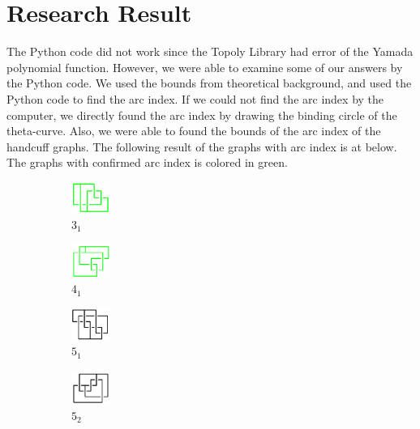 \documentclass{article}
\theoremstyle{definition}
\theoremstyle{theorem}
\theoremstyle{proposition}
\theoremstyle{corollary}
\begin{document}
\section{Research Result}
The Python code did not work since the Topoly Library had error of the Yamada polynomial function. However, we were able to examine some of our answers by the Python code.
We used the bounds from theoretical background, and used the Python code to find the arc index. If we could not find the arc index by the computer, we directly found the arc index by drawing the binding circle of the theta-curve.
 Also, we were able to found the bounds of the arc index of the handcuff graphs. The following result of the graphs with arc index is at below. The graphs with confirmed arc index is colored in green.\\
  \begin{figure}[H]
    \begin{subfigure}{0.075\textwidth}
    \includegraphics[width=1.25cm]{../Midterm_Poster/grid_diagram/theta_3_1.png}
    \caption{$3_1$} 
    \end{subfigure}
    \begin{subfigure}{0.075\textwidth}
    \includegraphics[width=1.25cm]{../Midterm_Poster/grid_diagram/theta_4_1.png}
    \caption{$4_1$} 
    \end{subfigure}
    \begin{subfigure}{0.075\textwidth}
    \includegraphics[width=1.25cm]{../Midterm_Poster/grid_diagram/theta_5_1.png}
    \caption{$5_1$}
    \end{subfigure}
    \begin{subfigure}{0.075\textwidth}
    \includegraphics[width=1.25cm]{../Midterm_Poster/grid_diagram/theta_5_2.png}
    \caption{$5_2$} 
    \end{subfigure}
    \begin{subfigure}{0.075\textwidth}

\end{subfigure}
\end{figure}
\end{document}
